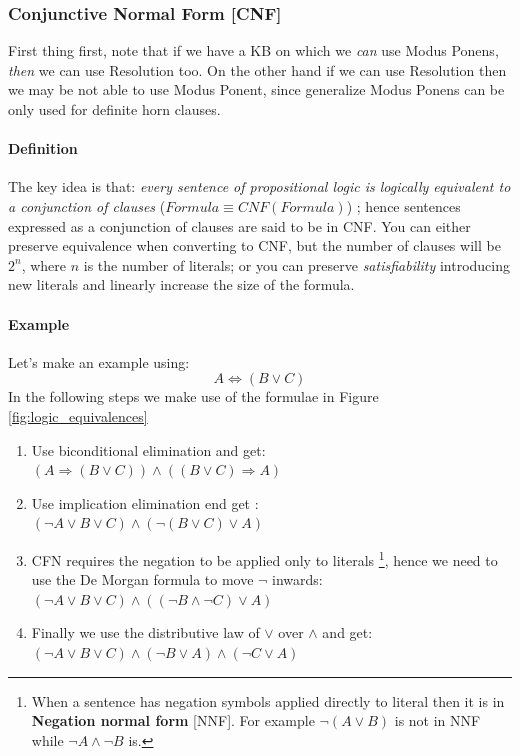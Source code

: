 \documentclass[10pt,a4paper]{article}
\begin{document}
\subsubsection{Conjunctive Normal Form [CNF]}
\label{subsec:cnf}

First thing first, note that if we have a KB on which we \textit{can} use Modus Ponens, \textit{then} we can use Resolution too. On the other hand if we can use Resolution then we may be not able to use Modus Ponent, since generalize Modus Ponens can be only used for definite horn clauses.



\paragraph{Definition}
The key idea is that: \textit{every sentence of propositional logic is logically equivalent to a conjunction of clauses} ($Formula\equiv CNF(Formula)$) ; hence sentences expressed as a conjunction of clauses are said to be in CNF. You can either preserve equivalence when converting to CNF, but the number of clauses will be $2^n$, where $n$ is the number of literals; or you can preserve \textit{satisfiability} introducing new literals and linearly increase the size of the formula.\\



\paragraph{Example}
Let's make an example using:
\[A \Leftrightarrow (B \vee C)\]
In the following steps we make use of the formulae in Figure \ref{fig:logic_equivalences}

\begin{enumerate}
\item Use biconditional elimination and get: \\$(A \Rightarrow (B \vee C))\wedge((B \vee C)\Rightarrow A)$
\item Use implication elimination end get :\\$(\neg A \vee B \vee C)\wedge(\neg(B\vee C)\vee A)$
\item CFN requires the negation to be applied only to literals \footnote{When a sentence has negation symbols applied directly to literal then it is in \textbf{Negation normal form} [NNF]. For example $\neg(A\vee B)$ is not in NNF while $\neg A \wedge \neg B$ is.}, hence we need to use the De Morgan formula to move $\neg$ inwards: \\$(\neg A \vee B \vee C)\wedge((\neg B\wedge \neg C)\vee A)$
\item Finally we use the distributive law of $\vee$ over $\wedge$ and get:\\
$(\neg A \vee B \vee C)\wedge(\neg B \vee A)\wedge(\neg C \vee A)$
\end{enumerate}
\end{document}
